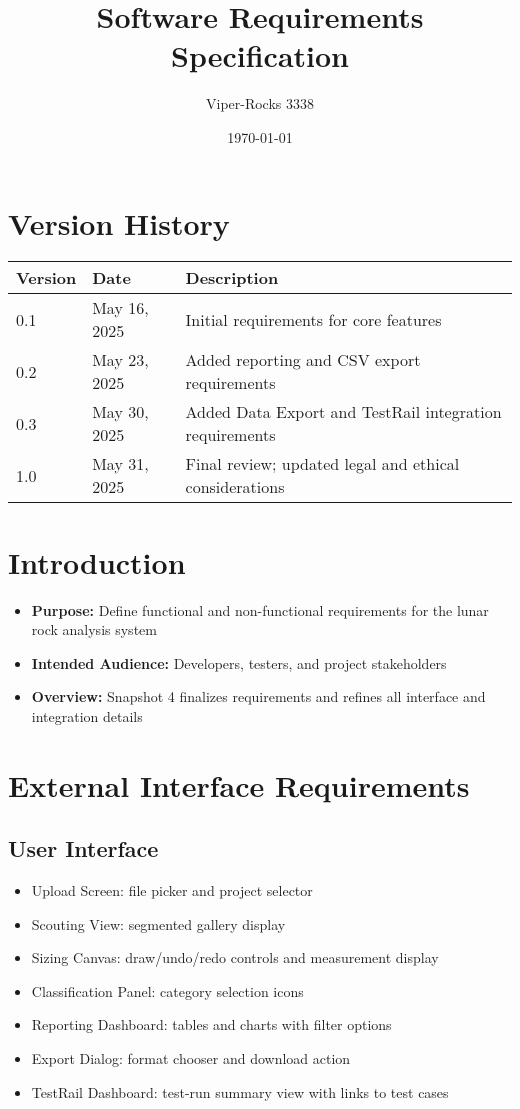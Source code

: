\documentclass{article}
\title{Software Requirements Specification}
\author{Viper-Rocks 3338}
\date{\today}
\begin{document}
\maketitle

\tableofcontents
\newpage

\section*{Version History}
\begin{tabular}{|l|l|p{8cm}|}
\hline
\textbf{Version} & \textbf{Date}       & \textbf{Description} \\ \hline
0.1   & May 16, 2025      & Initial requirements for core features \\ \hline
0.2   & May 23, 2025      & Added reporting and CSV export requirements \\ \hline
0.3   & May 30, 2025      & Added Data Export and TestRail integration requirements \\ \hline
1.0   & May 31, 2025      & Final review; updated legal and ethical considerations \\ \hline
\end{tabular}

\section{Introduction}
\begin{itemize}
  \item \textbf{Purpose:} Define functional and non-functional requirements for the lunar rock analysis system
  \item \textbf{Intended Audience:} Developers, testers, and project stakeholders
  \item \textbf{Overview:} Snapshot 4 finalizes requirements and refines all interface and integration details
\end{itemize}

\section{External Interface Requirements}

\subsection{User Interface}
\begin{itemize}
  \item Upload Screen: file picker and project selector
  \item Scouting View: segmented gallery display
  \item Sizing Canvas: draw/undo/redo controls and measurement display
  \item Classification Panel: category selection icons
  \item Reporting Dashboard: tables and charts with filter options
  \item Export Dialog: format chooser and download action
  \item TestRail Dashboard: test-run summary view with links to test cases
\end{itemize}
\end{document}
